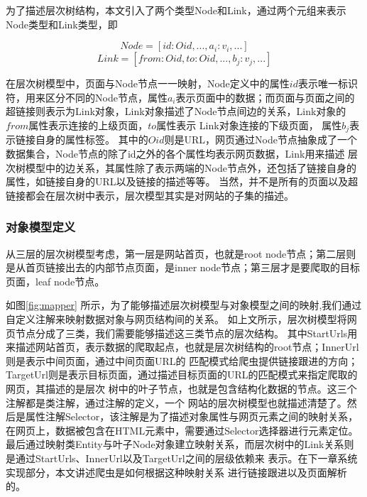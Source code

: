 \documentclass[master]{njuthesis}
\begin{document}
为了描述层次树结构，本文引入了两个类型Node和Link，通过两个元组来表示Node类型和Link类型，即

\[
  Node = [id: Oid, ..., a_i : v_i , ...]
\]
\[
  Link = [from: Oid, to : Oid, ..., b_j : v_j , ...]
\]

在层次树模型中，页面与Node节点一一映射，Node定义中的属性$id$表示唯一标识符，用来区分不同的Node节点，属性$a_i$表示页面中的数据；而页面与页面之间的超链接则表示为Link对象，Link对象描述了Node节点间边的关系，Link对象的$from$属性表示连接的上级页面，$to$属性表示
Link对象连接的下级页面， 属性$b_j$表示链接自身的属性标签。
其中的$Oid$则是URL，网页通过Node节点抽象成了一个数据集合，Node节点的除了id之外的各个属性均表示网页数据，Link用来描述
层次树模型中的边关系，其属性除了表示两端的Node节点外，还包括了链接自身的属性，如链接自身的URL以及链接的描述等等。
当然，并不是所有的页面以及超链接都会在层次树中表示，层次模型其实是对网站的子集的描述。

\subsubsection{对象模型定义}
从三层的层次树模型考虑，第一层是网站首页，也就是root node节点；第二层则是从首页链接出去的内部节点页面，是inner node节点；第三层才是要爬取的目标页面，leaf node节点。

如图\ref{fig:mapper} 所示，为了能够描述层次树模型与对象模型之间的映射,我们通过自定义注解来映射数据对象与网页结构间的关系。
如上文所示，层次树模型将网页节点分成了三类，我们需要能够描述这三类节点的层次结构。
其中StartUrls用来描述网站首页，表示数据的爬取起点，也就是层次树结构的root节点；InnerUrl则是表示中间页面，通过中间页面URL的
匹配模式给爬虫提供链接跟进的方向；TargetUrl则是表示目标页面，通过描述目标页面的URL的匹配模式来指定爬取的网页，其描述的是层次
树中的叶子节点，也就是包含结构化数据的节点。这三个注解都是类注解，通过注解的定义，一个
网站的层次树模型也就描述清楚了。然后是属性注解Selector，该注解是为了描述对象属性与网页元素之间的映射关系，
在网页上，数据被包含在HTML元素中，需要通过Selector选择器进行元素定位。
最后通过映射类Entity与叶子Node对象建立映射关系，而层次树中的Link关系则是通过StartUrls、InnerUrl以及TargetUrl之间的层级依赖来
表示。在下一章系统实现部分，本文讲述爬虫是如何根据这种映射关系
进行链接跟进以及页面解析的。
\end{document}
